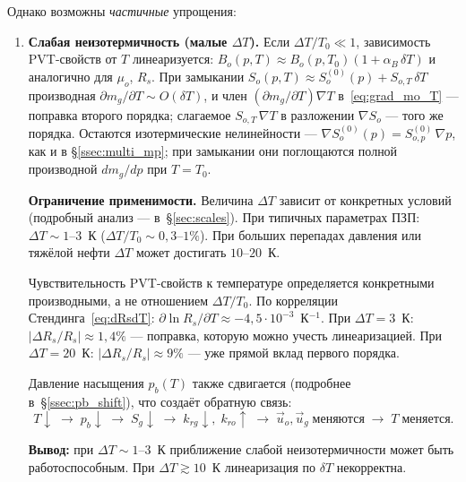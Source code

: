 ﻿\documentclass[12pt,a4paper]{article}
\begin{document}
Однако возможны \emph{частичные} упрощения:

\begin{enumerate}[nosep]
  \item \textbf{Слабая неизотермичность (малые $\Delta T$).}
        Если $\Delta T / T_0 \ll 1$, зависимость PVT-свойств от $T$
        линеаризуется: $B_o(p,T) \approx B_o(p,T_0)(1 + \alpha_B\,\delta T)$
        и аналогично для $\mu_o$, $R_s$.
        При замыкании $S_o(p,T) \approx S_o^{(0)}(p)
        + S_{o,T}\,\delta T$ производная
        $\partial m_g/\partial T \sim O(\delta T)$,
        и член $(\partial m_g/\partial T)\nabla T$ в~\eqref{eq:grad_mo_T}
        --- поправка второго порядка; слагаемое
        $S_{o,T}\,\nabla T$ в разложении $\nabla S_o$ --- того же
        порядка. Остаются изотермические нелинейности ---
        $\nabla S_o^{(0)}(p) = S_{o,p}^{(0)}\,\nabla p$, как и в
        \S\ref{ssec:multi_mp}; при замыкании они поглощаются
        полной производной $dm_g/dp$ при $T = T_0$.

        \textbf{Ограничение применимости.}
        Величина $\Delta T$ зависит от конкретных условий
        (подробный анализ --- в~\S\ref{sec:scales}).
        При типичных параметрах ПЗП: $\Delta T \sim 1$--$3$~К
        ($\Delta T / T_0 \sim 0{,}3$--$1\%$).
        При больших перепадах давления или тяжёлой нефти
        $\Delta T$ может достигать $10$--$20$~К.

        Чувствительность PVT-свойств к температуре определяется
        конкретными производными, а не отношением
        $\Delta T / T_0$.
        По корреляции Стендинга~\eqref{eq:dRsdT}:
        $\partial\ln R_s/\partial T \approx
        -4{,}5 \cdot 10^{-3}$~К$^{-1}$.
        При $\Delta T = 3$~К: $|\Delta R_s / R_s| \approx 1{,}4\%$
        --- поправка, которую можно учесть линеаризацией.
        При $\Delta T = 20$~К: $|\Delta R_s / R_s| \approx 9\%$
        --- уже прямой вклад первого порядка.

        Давление насыщения $p_b(T)$ также сдвигается
        (подробнее в~\S\ref{ssec:pb_shift}), что создаёт
        обратную связь:
        \[
          T\!\downarrow\;\to\; p_b\!\downarrow\;\to\;
          S_g\!\downarrow\;\to\;
          k_{rg}\!\downarrow,\;k_{ro}\!\uparrow\;\to\;
          \vec{u}_o,\vec{u}_g\;\text{меняются}\;\to\;
          T\;\text{меняется}.
        \]

        \textbf{Вывод:} при $\Delta T \sim 1$--$3$~К приближение
        слабой неизотермичности может быть работоспособным.
        При $\Delta T \gtrsim 10$~К линеаризация по $\delta T$
        некорректна.


\end{enumerate}
\end{document}

